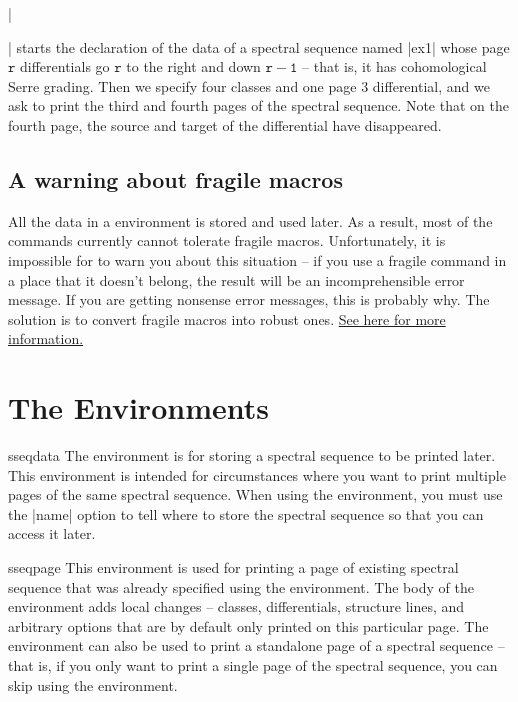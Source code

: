 |\begin{sseqdata}[|| name = ex1, cohomological Serre grading]| starts the declaration of the data of a spectral sequence named |ex1| whose page $\mathtt{r}$ differentials go $\mathtt{r}$ to the right and down $\mathtt{r-1}$ -- that is, it has cohomological Serre grading. Then we specify four classes and one page 3 differential, and we ask \sseqpages\space to print the third and fourth pages of the spectral sequence. Note that on the fourth page, the source and target of the differential have disappeared.

\subsection{A warning about fragile macros}%
All the data in a \sseqpages\space environment is stored and used later. As a result, most of the \sseqpages\space commands currently cannot tolerate fragile macros. Unfortunately, it is impossible for \sseqpages\space to warn you about this situation -- if you use a fragile command in a place that it doesn't belong, the result will be an incomprehensible error message. If you are getting nonsense error messages, this is probably why. The solution is to convert fragile macros into robust ones. \href{http://www.tex.ac.uk/FAQ-protect.html}{See here for more information.}

\section{The Environments}
\begin{environment}{{sseqdata}\moptions}
The \sseqdataenv\space environment is for storing a spectral sequence to be printed later. This environment is intended for circumstances where you want to print multiple pages of the same spectral sequence. When using the \sseqdataenv\space environment, you must use the |name| option to tell \sseqpages\space where to store the spectral sequence so that you can access it later.
\end{environment}

\begin{environment}{{sseqpage}\ooptions}
This environment is used for printing a page of existing spectral sequence that was already specified using the \sseqdataenv\space environment. The body of the environment adds local changes -- classes, differentials, structure lines, and arbitrary \tikzpkg\space options that are by default only printed on this particular page. The \sseqpageenv\space environment can also be used to print a standalone page of a spectral sequence -- that is, if you only want to print a single page of the spectral sequence, you can skip using the \sseqdataenv\space environment.
\end{environment}


\end{sseqdata}
